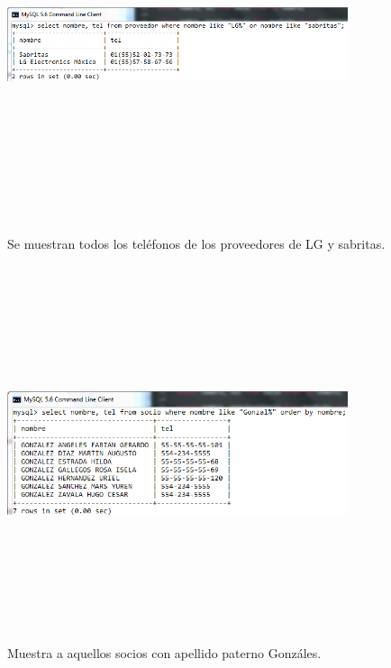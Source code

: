 \documentclass[12pt, titlepage]{article}
\begin{document}
\begin{figure}[H]
    \begin{center}
        \includegraphics[width=10cm, height=11cm]{img/sabritas.png}
        \caption{Se muestran todos los teléfonos de los proveedores de LG y sabritas.}
        \label{fig:arlter6}
    \end{center}
\end{figure}
\begin{figure}[H]
    \begin{center}
        \includegraphics[width=10cm, height=11cm]{img/gonzalez.png}
        \caption{Muestra a aquellos socios con apellido paterno Gonzáles.}
        \label{fig:arlter7}
    \end{center}
\end{figure}
\end{document}

